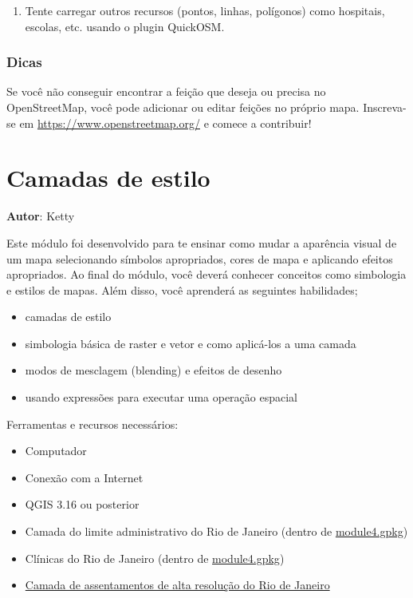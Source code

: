 \documentclass[
]{krantz}
\providecommand{\tightlist}{%
  \setlength{\itemsep}{0pt}\setlength{\parskip}{0pt}}
\begin{document}
\begin{enumerate}
\def\labelenumi{\arabic{enumi}.}
\tightlist
\item
  Tente carregar outros recursos (pontos, linhas, polígonos) como hospitais, escolas, etc. usando o plugin QuickOSM.
\end{enumerate}

\hypertarget{dicas-1}{%
\subsection{Dicas}\label{dicas-1}}

Se você não conseguir encontrar a feição que deseja ou precisa no OpenStreetMap, você pode adicionar ou editar feições no próprio mapa. Inscreva-se em \url{https://www.openstreetmap.org/} e comece a contribuir!

\hypertarget{camadas-de-estilo}{%
\chapter{Camadas de estilo}\label{camadas-de-estilo}}

\textbf{Autor}: Ketty

Este módulo foi desenvolvido para te ensinar como mudar a aparência visual de um mapa selecionando símbolos apropriados, cores de mapa e aplicando efeitos apropriados. Ao final do módulo, você deverá conhecer conceitos como simbologia e estilos de mapas. Além disso, você aprenderá as seguintes habilidades;

\begin{itemize}
\tightlist
\item
  camadas de estilo
\item
  simbologia básica de raster e vetor e como aplicá-los a uma camada
\item
  modos de mesclagem (blending) e efeitos de desenho
\item
  usando expressões para executar uma operação espacial
\end{itemize}

Ferramentas e recursos necessários:

\begin{itemize}
\tightlist
\item
  Computador
\item
  Conexão com a Internet
\item
  QGIS 3.16 ou posterior
\item
  Camada do limite administrativo do Rio de Janeiro (dentro de \href{data/module4/module4.gpkg}{module4.gpkg})
\item
  Clínicas do Rio de Janeiro (dentro de \href{data/module4/module4.gpkg}{module4.gpkg})
\item
  \href{data/module4/hrsl_rj_capital_populacao.tif}{Camada de assentamentos de alta resolução do Rio de Janeiro}
\end{itemize}
\end{document}
